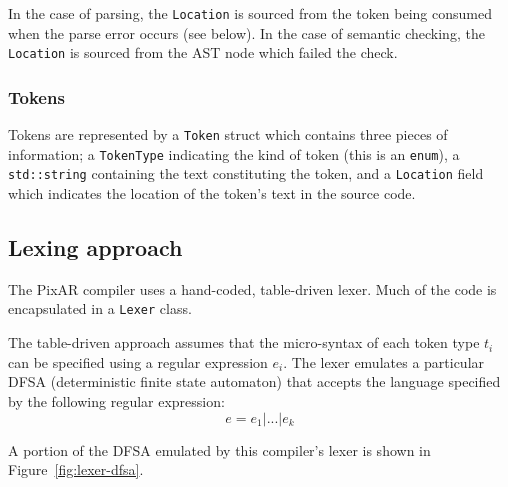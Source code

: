 \documentclass[11pt,a4paper]{scrartcl}
\begin{document}
In the case of parsing, the \verb|Location| is sourced from the token being consumed when the parse error occurs (see below). In the case of semantic checking, the \verb|Location| is sourced from the AST node which failed the check.

\subsubsection{Tokens}

Tokens are represented by a \verb|Token| struct which contains three pieces of information; a \verb|TokenType| indicating the kind of token (this is an \verb|enum|), a \verb|std::string| containing the text constituting the token, and a \verb|Location| field which indicates the location of the token's text in the source code.

\subsection{Lexing approach}

The PixAR compiler uses a hand-coded, table-driven lexer. Much of the code is encapsulated in a \verb|Lexer| class.

The table-driven approach\cite{cooper2011} assumes that the micro-syntax of each token type $t_{i}$ can be specified using a regular expression $e_{i}$. The lexer emulates a particular DFSA (deterministic finite state automaton) that accepts the language specified by the following regular expression:
$$ e = e_{1} | ... | e_{k} $$

A portion of the DFSA emulated by this compiler's lexer is shown in Figure~\ref{fig:lexer-dfsa}.
\end{document}
